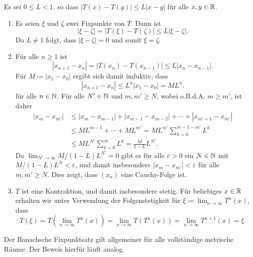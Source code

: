 \documentclass[a4paper,10pt]{article}
\begin{document}
\begin{solution}
 Es sei $0 \leq L < 1$, so dass $|T(x)-T(y)| \leq L|x-y|$ für alle $x,y \in \mathbb{R}$.
 \begin{enumerate}
  \item
   Es seien $\xi$ und $\zeta$ zwei Fixpunkte von $T$. Dann ist
   \[
    |\xi-\zeta| = |T(\xi)-T(\zeta)| \leq L|\xi-\zeta|.
   \]
   Da $L \neq 1$ folgt, dass $|\xi-\zeta| = 0$ und somit $\xi = \zeta$.
  \item
   Für alle $n \geq 1$ ist
   \[
    |x_{n+1} - x_n|
    = |T(x_n) - T(x_{n-1})|
    \leq L|x_n - x_{n-1}|.
   \]
   Für $M \coloneqq |x_1 - x_0|$ ergibt sich damit induktiv, dass
   \[
    |x_{n+1} - x_n| \leq L^n |x_1 - x_0| = M L^n.
   \]
   für alle $n \in \mathbb{N}$. Für alle $N' \in \mathbb{N}$ und $m, m' \geq N$, wobei o.B.d.A. $m \geq m'$, ist daher
   \begin{align*}
    |x_m - x_{m'}|
    &\leq |x_m - x_{m-1}| + |x_{m-1} - x_{m-2}| + \dotsb + |x_{m'+1} - x_{m'}| \\
    &\leq M L^{m-1} + \dotsb + M L^{m'}
    = M L^{m'} \sum_{k=0}^{m-1-m'} L^k \\
    &\leq M L^{N'} \sum_{k=0}^\infty L^k
    = \frac{M}{1-L} L^{N'}.
   \end{align*}
   Da $\lim_{N' \to \infty} M/(1-L) L^{N'} = 0$ gibt es für alle $\varepsilon > 0$ ein $N \in \mathbb{N}$ mit $M/(1-L) L^N < \varepsilon$, und damit insbesondere $|x_m - x_{m'}| < \varepsilon$ für alle $m, m' \geq N$. Dies zeigt, dass $(x_n)$ eine Cauchy-Folge ist.
  \item
   $T$ ist eine Kontraktion, und damit insbesondere stetig. Für beliebiges $x \in \mathbb{R}$ erhalten wir unter Verwendung der Folgenstetigkeit für $\xi \coloneqq \lim_{n \to \infty} T^n(x)$, dass
   \[
    T(\xi)
    = T\left(\lim_{n \to \infty} T^n(x)\right)
    = \lim_{n \to \infty} T(T^n(x))
    = \lim_{n \to \infty} T^{n+1}(x)
    = \xi.
   \]
 \end{enumerate}
\end{solution}


\begin{bem}
 Der Banachsche Fixpunktsatz gilt allgemeiner für alle vollständige metrische Räume. Der Beweis hierfür läuft analog.
\end{bem}


\newpage


\printsolutions
\end{document}
